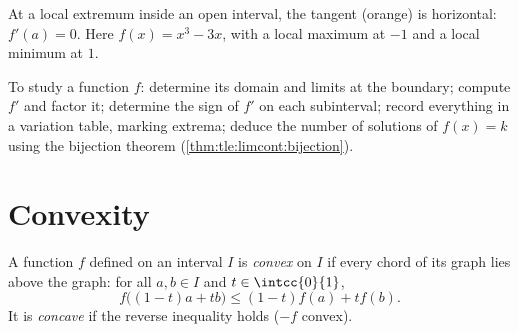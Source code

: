 \begin{omfigure}

{\small At a local extremum inside an open interval, the tangent
(orange) is horizontal: $f'(a) = 0$. Here $f(x) = x^3 - 3x$, with a
local maximum at $-1$ and a local minimum at $1$.}
\end{omfigure}

\begin{method}\label{met:tle:deriv:table}
To study a function $f$: determine its domain and limits at the boundary;
compute $f'$ and factor it; determine the sign of $f'$ on each subinterval;
record everything in a variation table, marking extrema; deduce the number of
solutions of $f(x) = k$ using the bijection theorem
(\cref{thm:tle:limcont:bijection}).
\end{method}

\section{Convexity}

\begin{definition}\label{def:tle:deriv:convex}
A function $f$ defined on an interval $I$ is \emph{convex}
on $I$ if every chord of its graph lies above the graph: for all
$a, b \in I$ and $t \in \intcc{0}{1}$,
\[
f\bigl((1-t)a + t b\bigr) \leq (1-t) f(a) + t f(b).
\]
It is \emph{concave} if the reverse inequality holds ($-f$ convex).
\end{definition}

